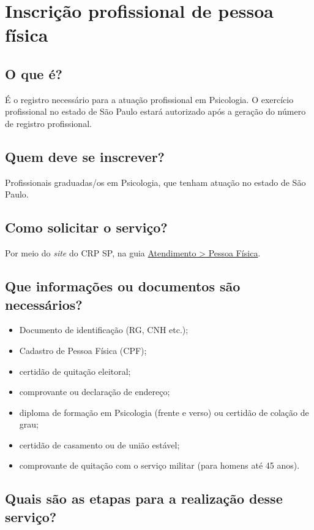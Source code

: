 \chapter{Inscrição profissional de pessoa física}%
\label{chap:pf-inscricao}

\section{O que é?}

É o registro necessário para a atuação profissional em Psicologia. O exercício profissional no estado de São Paulo estará autorizado após a geração do número de registro profissional.

\section{Quem deve se inscrever?}

Profissionais graduadas/os em Psicologia, que tenham atuação no estado de São Paulo.

\section{Como solicitar o serviço?}

Por meio do \textit{site} do CRP SP, na guia \href{https://www.crpsp.org/pagina/view/308}{Atendimento > Pessoa Física}.

\section{Que informações ou documentos são necessários?}

\begin{itemize}
\item	 Documento de identificação (RG, CNH etc.);
\item	 Cadastro de Pessoa Física (CPF);
\item	 certidão de quitação eleitoral;
\item	 comprovante ou declaração de endereço;
\item	 diploma de formação em Psicologia (frente e verso) ou certidão de colação de grau;
\item	 certidão de casamento ou de união estável;
\item	 comprovante de quitação com o serviço militar (para homens até 45 anos).
\end{itemize}

\section{Quais são as etapas para a realização desse serviço?}

